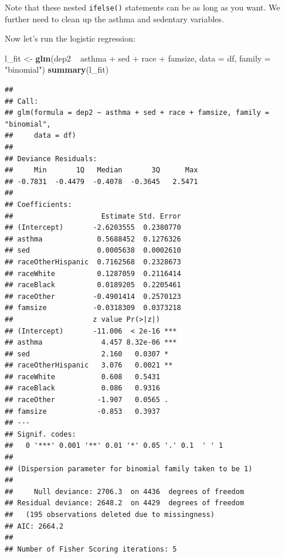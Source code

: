 \documentclass[]{tufte-book}
\newenvironment{Shaded}{}{}
\newcommand{\KeywordTok}[1]{\textcolor[rgb]{0.00,0.44,0.13}{\textbf{#1}}}
\newcommand{\DataTypeTok}[1]{\textcolor[rgb]{0.56,0.13,0.00}{#1}}
\newcommand{\DecValTok}[1]{\textcolor[rgb]{0.25,0.63,0.44}{#1}}
\newcommand{\StringTok}[1]{\textcolor[rgb]{0.25,0.44,0.63}{#1}}
\newcommand{\OperatorTok}[1]{\textcolor[rgb]{0.40,0.40,0.40}{#1}}
\newcommand{\NormalTok}[1]{#1}
\theoremstyle{definition}
\theoremstyle{definition}
\theoremstyle{remark}
\begin{document}
Note that these nested \texttt{ifelse()} statements can be as long as
you want. We further need to clean up the asthma and sedentary
variables.

\begin{Shaded}
\end{Shaded}

Now let's run the logistic regression:

\begin{Shaded}
\begin{Highlighting}[]
\NormalTok{l_fit <-}\StringTok{ }\KeywordTok{glm}\NormalTok{(dep2 }\OperatorTok{~}\StringTok{ }\NormalTok{asthma }\OperatorTok{+}\StringTok{ }\NormalTok{sed }\OperatorTok{+}\StringTok{ }\NormalTok{race }\OperatorTok{+}\StringTok{ }\NormalTok{famsize, }
    \DataTypeTok{data =}\NormalTok{ df, }\DataTypeTok{family =} \StringTok{"binomial"}\NormalTok{)}
\KeywordTok{summary}\NormalTok{(l_fit)}
\end{Highlighting}
\end{Shaded}

\begin{verbatim}
## 
## Call:
## glm(formula = dep2 ~ asthma + sed + race + famsize, family = "binomial", 
##     data = df)
## 
## Deviance Residuals: 
##     Min       1Q   Median       3Q      Max  
## -0.7831  -0.4479  -0.4078  -0.3645   2.5471  
## 
## Coefficients:
##                     Estimate Std. Error
## (Intercept)       -2.6203555  0.2380770
## asthma             0.5688452  0.1276326
## sed                0.0005638  0.0002610
## raceOtherHispanic  0.7162568  0.2328673
## raceWhite          0.1287059  0.2116414
## raceBlack          0.0189205  0.2205461
## raceOther         -0.4901414  0.2570123
## famsize           -0.0318309  0.0373218
##                   z value Pr(>|z|)    
## (Intercept)       -11.006  < 2e-16 ***
## asthma              4.457 8.32e-06 ***
## sed                 2.160   0.0307 *  
## raceOtherHispanic   3.076   0.0021 ** 
## raceWhite           0.608   0.5431    
## raceBlack           0.086   0.9316    
## raceOther          -1.907   0.0565 .  
## famsize            -0.853   0.3937    
## ---
## Signif. codes:  
##   0 '***' 0.001 '**' 0.01 '*' 0.05 '.' 0.1  ' ' 1
## 
## (Dispersion parameter for binomial family taken to be 1)
## 
##     Null deviance: 2706.3  on 4436  degrees of freedom
## Residual deviance: 2648.2  on 4429  degrees of freedom
##   (195 observations deleted due to missingness)
## AIC: 2664.2
## 
## Number of Fisher Scoring iterations: 5
\end{verbatim}
\end{document}
